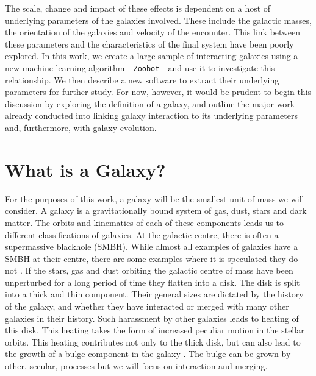 The scale, change and impact of these effects is dependent on a host of underlying parameters of the galaxies involved. These include the galactic masses, the orientation of the galaxies and velocity of the encounter. This link between these parameters and the characteristics of the final system have been poorly explored. In this work, we create a large sample of interacting galaxies using a new machine learning algorithm - \texttt{Zoobot} - and use it to investigate this relationship. We then describe a new software to extract their underlying parameters for further study. For now, however, it would be prudent to begin this discussion by exploring the definition of a galaxy, and outline the major work already conducted into linking galaxy interaction to its underlying parameters and, furthermore, with galaxy evolution.

\section{What is a Galaxy?}
\noindent For the purposes of this work, a galaxy will be the smallest unit of mass we will consider. A galaxy is a gravitationally bound system of gas, dust, stars and dark matter. The orbits and kinematics of each of these components leads us to different classifications of galaxies. At the galactic centre, there is often a supermassive blackhole (SMBH). While almost all examples of galaxies have a SMBH at their centre, there are some examples where it is speculated they do not \citep{2001AJ....122.2469G}. If the stars, gas and dust orbiting the galactic centre of mass have been unperturbed for a long period of time they flatten into a disk. The disk is split into a thick and thin component. Their general sizes are dictated by the history of the galaxy, and whether they have interacted or merged with many other galaxies in their history. Such harassment by other galaxies leads to heating of this disk. This heating takes the form of increased peculiar motion in the stellar orbits. This heating contributes not only to the thick disk, but can also lead to the growth of a bulge component in the galaxy \citep{2010ApJ...715..202H, 2017ApJ...837L...8B}. The bulge can be grown by other, secular, processes but we will focus on interaction and merging.

